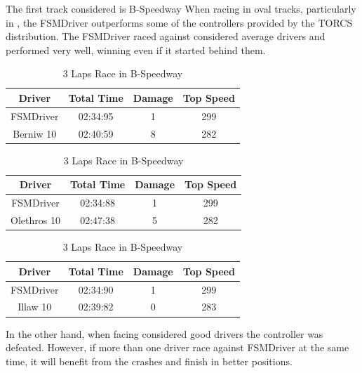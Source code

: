 The first track considered is B-Speedway
When racing in oval tracks, particularly in , the FSMDriver outperforms 
some of the controllers provided by the TORCS distribution. The FSMDriver raced 
against considered average drivers and performed very well, winning even if it 
started behind them.

\begin{table}[h]
\renewcommand{\arraystretch}{1.3}
\caption{3 Laps Race in B-Speedway}
\label{table_1}
\centering
\begin{tabular}{c||c||c||c}
\hline
\bfseries Driver & \bfseries Total Time & \bfseries Damage & \bfseries Top Speed \\ 
\hline
\hline FSMDriver & 02:34:95 & 1 & 299 \\ 
\hline Berniw 10 & 02:40:59 & 8 & 282 \\ 
\hline 
\end{tabular}
\end{table}

\begin{table}[h]
\renewcommand{\arraystretch}{1.3}
\caption{3 Laps Race in B-Speedway}
\label{table_2}
\centering
\begin{tabular}{c||c||c||c}
\hline
\bfseries Driver & \bfseries Total Time & \bfseries Damage & \bfseries Top Speed \\ 
\hline
\hline FSMDriver & 02:34:88 & 1 & 299 \\ 
\hline Olethros 10 & 02:47:38 & 5 & 282 \\ 
\hline 
\end{tabular}
\end{table}

\begin{table}[h]
\renewcommand{\arraystretch}{1.3}
\caption{3 Laps Race in B-Speedway}
\label{table_3}
\centering
\begin{tabular}{c||c||c||c}
\hline
\bfseries Driver & \bfseries Total Time & \bfseries Damage & \bfseries Top Speed \\ 
\hline
\hline FSMDriver & 02:34:90 & 1 & 299 \\ 
\hline Illaw 10 & 02:39:82 & 0 & 283 \\ 
\hline 
\end{tabular}
\end{table}



In the other hand, when facing considered good drivers the controller was defeated. However, if more than one driver race against FSMDriver at the same time, it will benefit from the crashes and finish in better positions.

